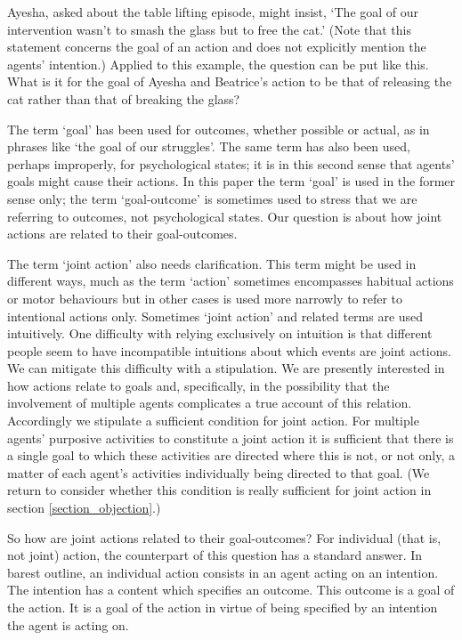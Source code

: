 \documentclass[12pt,a4paper]{extarticle}
\begin{document}
Ayesha, asked about the table lifting episode, might insist, `The goal of our intervention wasn't to smash the glass but to free the cat.'  
(Note that this statement concerns the goal of an action and does not explicitly mention the agents' intention.)  
Applied to this example, the question can be put like this.  
What is it for the goal of Ayesha and Beatrice's action to be that of releasing the cat rather than that of breaking the glass?

The term `goal' has been used for outcomes, whether possible or actual, as in phrases like `the goal of our struggles'.  The same term has also been used, perhaps improperly, for psychological states; it is in this second sense that agents' goals might cause their actions.  In this paper the term `goal' is used in the former sense only; the term `goal-outcome' is sometimes used to stress that we are referring to outcomes, not psychological states.  Our question is about how joint actions are related to their goal-outcomes.  

The term `joint action' also needs clarification.  This term might be used in different ways, much as the term `action' sometimes encompasses habitual actions or motor behaviours but in other cases is used more narrowly to refer to intentional actions only.  
Sometimes `joint action' and related terms are used intuitively.
One difficulty with relying exclusively on intuition is that different people seem to have incompatible intuitions about which events are joint actions.
We can mitigate this difficulty with a stipulation.
We are presently interested in how actions relate to goals and, specifically, in the possibility that the involvement of multiple agents complicates a true account of this relation.  Accordingly we stipulate a sufficient condition for joint action.  For multiple agents' purposive activities to constitute a joint action it is sufficient that there is a single goal to which these activities are directed where this is not, or not only, a matter of each agent's activities individually being directed to that goal.   
(We return to consider whether this condition is really sufficient for joint action in section \vref{section_objection}.)

So how are joint actions related to their goal-outcomes?  For individual (that is, not joint) action, the counterpart of this question has a standard answer.  In barest outline, an individual action consists in an agent acting on an intention.  The intention has a content which specifies an outcome.
This outcome is a goal of the action.
It is a goal of the action in virtue of being specified by an intention the agent is acting on. 
\end{document}
